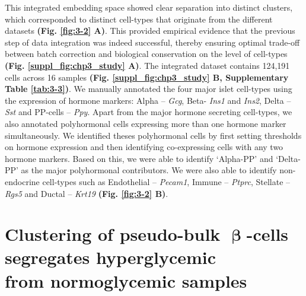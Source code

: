 This integrated embedding space showed clear separation into distinct clusters, which corresponded to distinct cell-types that originate from the different datasets \textbf{(Fig. \ref{fig:3-2} A)}. This provided empirical evidence that the previous step of data integration was indeed successful, thereby ensuring optimal trade-off between batch correction and biological conservation on the level of cell-types \textbf{(Fig. \ref{suppl_fig:chp3_study} A)}. The integrated dataset contains 124,191 cells across 16 samples \textbf{(Fig. \ref{suppl_fig:chp3_study} B, Supplementary Table \ref{tab:3-3})}. We manually annotated the four major islet cell-types using the expression of hormone markers: Alpha – \textit{Gcg}, Beta- \textit{Ins1} and \textit{Ins2}, Delta – \textit{Sst} and PP-cells – \textit{Ppy}. Apart from the major hormone secreting cell-types, we also annotated polyhormonal cells expressing more than one hormone marker simultaneously. We identified theses polyhormonal cells by first setting thresholds on hormone expression and then identifying co-expressing cells with any two hormone markers. Based on this, we were able to identify `Alpha-PP’ and `Delta-PP’ as the major polyhormonal contributors. We were also able to identify non-endocrine cell-types such as Endothelial – \textit{Pecam1}, Immune – \textit{Ptprc}, Stellate – \textit{Rgs5} and Ductal – \textit{Krt19} \textbf{(Fig. \ref{fig:3-2} B)}.



\clearpage

\section{Clustering of pseudo-bulk \( \mathbf{\upbeta}\)-cells segregates hyperglycemic\\from normoglycemic samples}
\label{sec:chp3_pseudobulk}

